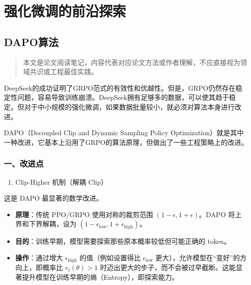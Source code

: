\hypertarget{ux5f3aux5316ux5faeux8c03ux7684ux524dux6cbfux63a2ux7d22}{%
\chapter{强化微调的前沿探索}\label{ux5f3aux5316ux5faeux8c03ux7684ux524dux6cbfux63a2ux7d22}}

\hypertarget{dapoux7b97ux6cd5}{%
\section{DAPO算法}\label{dapoux7b97ux6cd5}}

\begin{quote}
本文是论文阅读笔记，内容代表对应论文方法或作者理解，不应直接视为领域共识或工程最佳实践。
\end{quote}

DeepSeek的成功证明了GRPO范式的有效性和优越性。但是，GRPO仍然存在稳定性问题，容易导致训练崩溃。DeepSeek拥有足够多的数据，可以使其趋于稳定。但对于中小规模的强化微调，如果数据批量较小，就必须对算法本身进行改进。

DAPO（Decoupled Clip and Dynamic Sampling Policy Optimization）就是其中一种改进，它基本上沿用了GRPO的算法原理，但做出了一些工程策略上的改进。

\hypertarget{ux4e00ux6539ux8fdbux70b9}{%
\subsection{一、改进点}\label{ux4e00ux6539ux8fdbux70b9}}

\begin{enumerate}
\def\labelenumi{\arabic{enumi}.}
\tightlist
\item
  Clip-Higher 机制（解耦 Clip）
\end{enumerate}

这是 DAPO 最显著的数学改进。

\begin{itemize}
\tightlist
\item
  \textbf{原理}：传统 PPO/GRPO 使用对称的裁剪范围 \((1-\epsilon, 1+\epsilon)\)。DAPO 将上界和下界解耦，设为 \((1-\epsilon_{\mathrm{low}}, 1+\epsilon_{\mathrm{high}})\)。
\item
  \textbf{目的}：训练早期，模型需要探索那些原本概率较低但可能正确的 token。
\item
  \textbf{操作}：通过增大 \(\epsilon_{\mathrm{high}}\) 的值（例如设置得比 \(\epsilon_{\mathrm{low}}\) 更大），允许模型在``变好''的方向上，即概率比 \(r_t(\theta)>1\) 时迈出更大的步子，而不会被过早截断。这能显著提升模型在训练早期的熵（Entropy），即探索能力。
\end{itemize}

